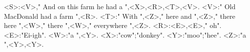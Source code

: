 <S>:<V>," And on this farm he had a ",<X>,<R>,<T>,<V>.
<V>:" Old MacDonald had a farm ",<R>.
<T>:" With ",<Z>," here and ",<Z>," there here ",<W>," there ",<W>," everywhere ",<Z>.
<R>:<E>,<E>," oh".
<E>:"Ei-igh".
<W>:"a ",<Y>.
<X>:"cow";"donkey".
<Y>:"moo";"hee".
<Z>:"a ",<Y>,<Y>.